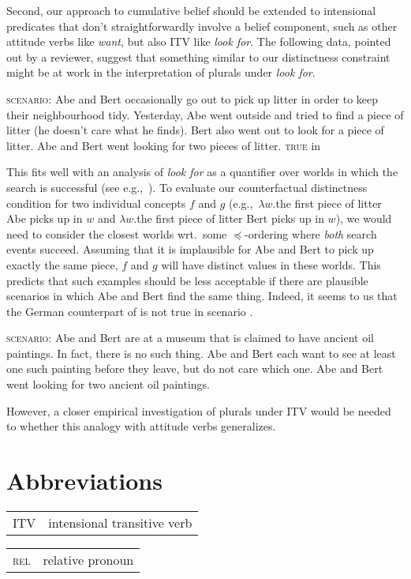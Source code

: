 \documentclass[output=paper]{langscibook}
\begin{document}
Second, our approach to cumulative belief should be extended to intensional predicates that don't straightforwardly involve a belief component, such as other attitude verbs like \textit{want}, but also ITV like \textit{look for}. The following data, pointed out by a reviewer, suggest that something similar to our distinctness constraint might be at work in the interpretation of plurals under \textit{look for}. 

\eanoraggedright
\eanoraggedright \label{sch-has:ex:rev2a}\textsc{scenario:} Abe and Bert occasionally go out to pick up litter in order to
keep their neighbourhood tidy. Yesterday, Abe went outside and tried to
find a piece of litter (he doesn’t care what he finds). Bert also went out to
look for a piece of litter.
\ex \label{sch-has:ex:rev2}Abe and Bert went looking for two pieces of litter. \hfill \textsc{true} in 
\z\z

\noindent This fits well with an analysis of \textit{look for} as a quantifier over worlds in which the search is successful (see e.g.,~\citealt{Zimmermann:1993,Zimmermann:2006}). To evaluate our counterfactual distinctness condition for two individual concepts $f$ and $g$ (e.g.,~$\lambda w.$the first piece of litter Abe picks up in $w$ and $\lambda w.$the first piece of litter Bert picks up in $w$), we would need to consider the closest worlds wrt.~some $\preceq$-ordering where \textit{both} search events succeed. Assuming that it is implausible for Abe and Bert to pick up exactly the same piece, $f$ and $g$ will have distinct values in these worlds. This predicts that such examples should be less acceptable if there are plausible scenarios in which Abe and Bert find the same thing. Indeed, it seems to us that the German counterpart of  is not true in scenario .

\eanoraggedright 
\eanoraggedright \label{sch-has:ex:rev3a} \textsc{scenario:} Abe and Bert are at a museum that is claimed to have ancient oil paintings. In fact, there is no such thing. Abe and Bert each want to see at least one such painting before they leave, but do not care which one.
\ex \label{sch-has:ex:rev3} Abe and Bert went looking for two ancient oil paintings. \z\z

\noindent However, a closer empirical investigation of plurals under ITV would be needed to whether this analogy with attitude verbs generalizes.

\section*{Abbreviations}
\begin{tabularx}{.45\textwidth}{lQ}
ITV & intensional transitive verb \\
\end{tabularx}
\begin{tabularx}{.45\textwidth}{lQ}
\textsc{rel} & relative pronoun \\
\end{tabularx}
\end{document}
